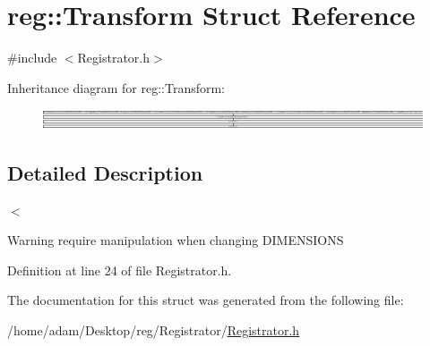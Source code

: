 \hypertarget{structreg_1_1_transform}{}\section{reg\+:\+:Transform Struct Reference}
\label{structreg_1_1_transform}


{\ttfamily \#include $<$Registrator.\+h$>$}

Inheritance diagram for reg\+:\+:Transform\+:\begin{figure}[H]
\begin{center}
\leavevmode
\includegraphics[height=0.595745cm]{structreg_1_1_transform}
\end{center}
\end{figure}


\subsection{Detailed Description}
$<$ \begin{DoxyWarning}{Warning}
require manipulation when changing D\+I\+M\+E\+N\+S\+I\+O\+NS 
\end{DoxyWarning}


Definition at line 24 of file Registrator.\+h.



The documentation for this struct was generated from the following file\+:\begin{DoxyCompactItemize}
\item 
/home/adam/\+Desktop/reg/\+Registrator/\hyperlink{_registrator_8h}{Registrator.\+h}\end{DoxyCompactItemize}

